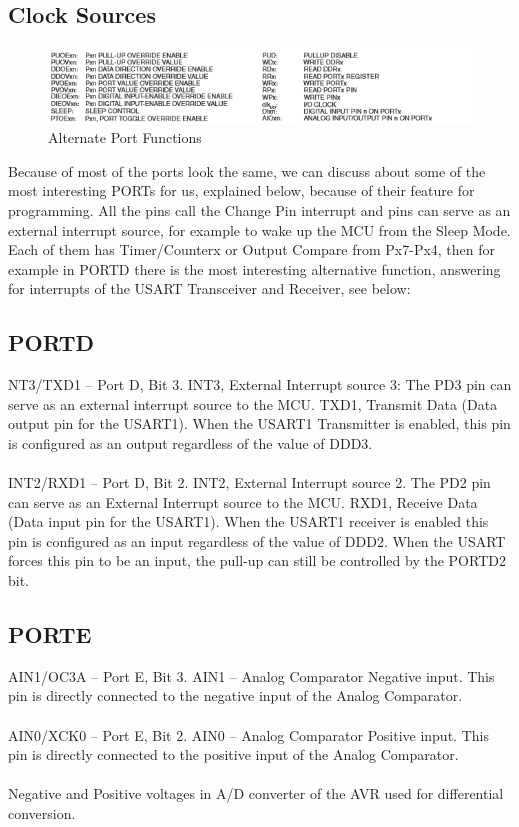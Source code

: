\documentclass[english]{article}
\begin{document}
\subsection{Clock Sources}
\begin{figure}[H]
\caption{Alternate Port Functions}
\centerline{\includegraphics[scale=0.8]{MicroLab1/pictures/3}}
\end{figure}
Because of most of the ports look the same, we can discuss about some of the most interesting PORTs for us, explained below, because of their feature for programming. All the pins call the Change Pin interrupt and pins can serve as an external interrupt source, for example to wake up the MCU from the Sleep Mode. Each of them has Timer/Counterx or Output Compare from Px7-Px4, then for example in PORTD there is the most interesting alternative function, answering for interrupts of the USART Transceiver and Receiver, see below:
\subsection{PORTD}
NT3/TXD1 – Port D, Bit 3. INT3, External Interrupt source 3: The PD3 pin can serve as an external interrupt source to the MCU. TXD1, Transmit Data (Data output pin for the USART1). When the USART1 Transmitter is enabled, this pin is configured as an output regardless of the value of DDD3.\\\\
INT2/RXD1 – Port D, Bit 2. INT2, External Interrupt source 2. The PD2 pin can serve as an External Interrupt source to the MCU. RXD1, Receive Data (Data input pin for the USART1). When the USART1 receiver is enabled this pin is configured as an input regardless of the value of DDD2. When the USART forces this pin to be an input, the pull-up can still be controlled by the PORTD2 bit.
\subsection{PORTE}
AIN1/OC3A – Port E, Bit 3. AIN1 – Analog Comparator Negative input. This pin is directly connected to the negative input of the Analog Comparator.\\\\
AIN0/XCK0 – Port E, Bit 2. AIN0 – Analog Comparator Positive input. This pin is directly connected to the positive input of the Analog Comparator.\\\\
Negative and Positive voltages in A/D converter of the AVR used for differential conversion.
\end{document}
